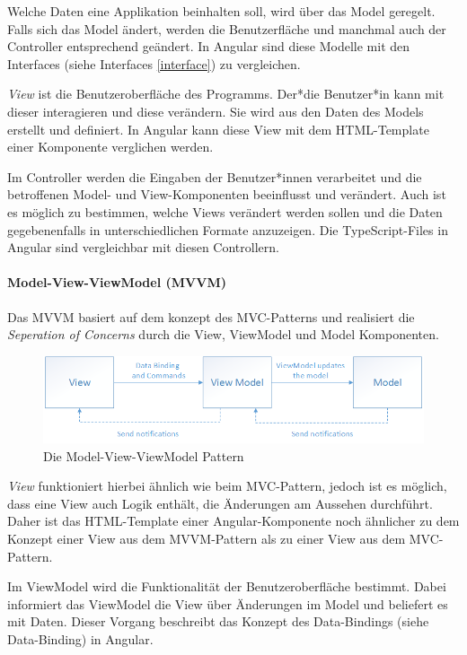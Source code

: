 Welche Daten eine Applikation beinhalten soll, wird über das Model geregelt. Falls sich das Model ändert, werden die Benutzerfläche und manchmal auch der Controller entsprechend geändert. In Angular sind diese Modelle mit den Interfaces (siehe Interfaces \ref{interface})  zu vergleichen.

\emph{View} ist die Benutzeroberfläche des Programms. Der*die Benutzer*in kann mit dieser interagieren und diese verändern. Sie wird aus den Daten des Models erstellt und definiert. In Angular kann diese View mit dem HTML-Template einer Komponente verglichen werden.

Im Controller werden die Eingaben der Benutzer*innen verarbeitet und die betroffenen Model- und View-Komponenten beeinflusst und verändert. Auch ist es möglich zu bestimmen, welche Views verändert werden sollen und die Daten gegebenenfalls in unterschiedlichen Formate anzuzeigen. Die TypeScript-Files in Angular sind vergleichbar mit diesen Controllern.
\cite{MVC}

\paragraph{Model-View-ViewModel (MVVM)}
Das MVVM basiert auf dem konzept des MVC-Patterns und realisiert die \emph{Seperation of Concerns} durch die View, ViewModel und Model Komponenten.

\begin{figure} [h t]
  \centering
  \includegraphics[scale=0.5]{pics/mvvm-pattern.png}
  \caption{Die Model-View-ViewModel Pattern \cite{MVVM}}
  \label{fig:tech:front:mvc-architecture}
\end{figure}

\emph{View} funktioniert hierbei ähnlich wie beim MVC-Pattern, jedoch ist es möglich, dass eine View auch Logik enthält, die Änderungen am Aussehen durchführt. Daher ist das HTML-Template einer Angular-Komponente noch ähnlicher zu dem Konzept einer View aus dem MVVM-Pattern als zu einer View aus dem MVC-Pattern. 

Im ViewModel wird die Funktionalität der Benutzeroberfläche bestimmt. Dabei informiert das ViewModel die View über Änderungen im Model und beliefert es mit Daten. Dieser Vorgang beschreibt das Konzept des Data-Bindings (siehe Data-Binding) in Angular.  

